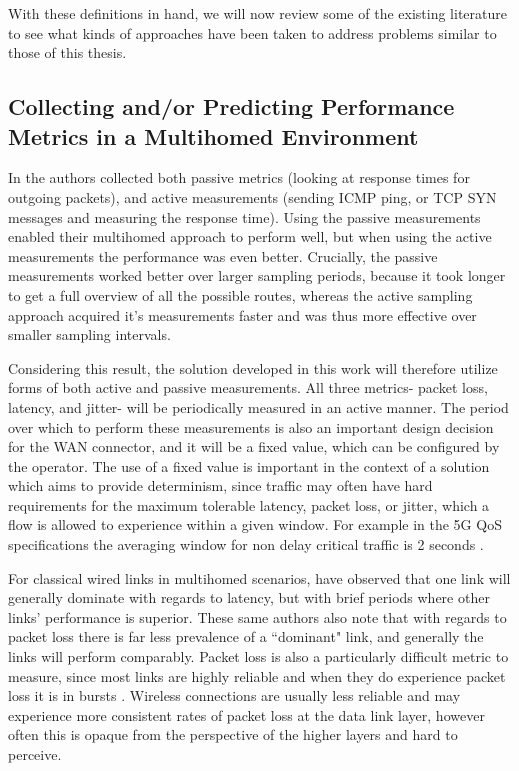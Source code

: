 With these definitions in hand, we will now review some of the existing literature to see what kinds of approaches have been taken to address problems similar to those of this thesis.

\subsection{Collecting and/or Predicting Performance Metrics in a Multihomed Environment}

In \cite{akella2008performance} the authors collected both passive metrics (looking at response times for outgoing packets), and active measurements (sending ICMP ping, or TCP SYN messages and measuring the response time). Using the passive measurements enabled their multihomed approach to perform well, but when using the active measurements the performance was even better. Crucially, the passive measurements worked better over larger sampling periods, because it took longer to get a full overview of all the possible routes, whereas the active sampling approach acquired it's measurements faster and was thus more effective over smaller sampling intervals.

Considering this result, the solution developed in this work will therefore utilize forms of both active and passive measurements. All three metrics- packet loss, latency, and jitter- will be periodically measured in an active manner. The period over which to perform these measurements is also an important design decision for the WAN connector, and it will be a fixed value, which can be configured by the operator. The use of a fixed value is important in the context of a solution which aims to provide determinism, since traffic may often have hard requirements for the maximum tolerable latency, packet loss, or jitter, which a flow is allowed to experience within a given window. For example in the 5G QoS specifications the averaging window for non delay critical traffic is 2 seconds \cite{3gpp.23.501}.

For classical wired links in multihomed scenarios, \cite{tao2004exploring} have observed that one link will generally dominate with regards to latency, but with brief periods where other links' performance is superior. These same authors also note that with regards to packet loss there is far less prevalence of a “dominant" link, and generally the links will perform comparably. Packet loss is also a particularly difficult metric to measure, since most links are highly reliable and when they do experience packet loss it is in bursts \cite{tao2004exploring}. Wireless connections are usually less reliable and may experience more consistent rates of packet loss at the data link layer, however often this is opaque from the perspective of the higher layers and hard to perceive.

